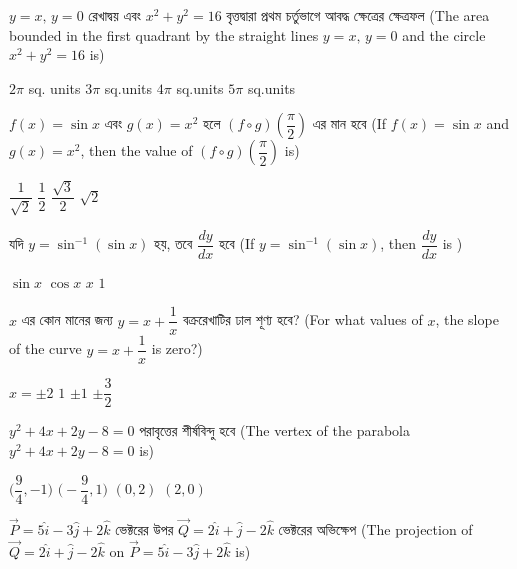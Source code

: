 \documentclass[addpoints]{exam}
\begin{document}
\begin{questions}
\question   $ y=x,\, y=0 $ রেখাদ্বয় এবং $ x^2 + y^2 =16 $ বৃত্তদ্বারা প্রথম চর্তুভাগে আবদ্ধ ক্ষেত্রের ক্ষেত্রফল (The area bounded in the first quadrant by the straight lines $ y=x,\, y=0 $ and the circle $ x^2 + y^2 =16 $ is)

\begin{oneparchoices}
\choice $ 2\pi$ sq. units
\choice $ 3\pi $ sq.units
\choice $ 4\pi $ sq.units
\choice $ 5\pi $ sq.units

\end{oneparchoices}

\question  $ f(x) = \sin x $ এবং $ g(x) = x^2 $ হলে $ (f\circ g)(\dfrac{\pi}{2}) $ এর মান হবে (If $ f(x) = \sin x $ and $ g(x) = x^2 $, then the value of $ (f\circ g)(\dfrac{\pi}{2}) $ is)

\begin{oneparchoices}
\choice $ \dfrac{1}{\sqrt{2}}$ 
\choice $ \dfrac{1}{2} $ 
\choice $ \dfrac{\sqrt{3}}{2} $ 
\choice $ \sqrt{2} $ 

\end{oneparchoices}

\question    যদি $ y=\sin^{-1}(\sin x) $ হয়,  তবে $ \dfrac{dy}{dx} $ হবে (If $ y=\sin^{-1}(\sin x) $, then $ \dfrac{dy}{dx} $ is )

\begin{oneparchoices}
\choice $ \sin x$ 
\choice $ \cos x $ 
\choice $ x $ 
\choice $ 1 $ 

\end{oneparchoices}

\question    $ x $ এর কোন মানের জন্য $ y= x+ \dfrac{1}{x} $ বক্ররেখাটির ঢাল শূণ্য হবে? (For what values of $ x $, the slope of the curve $ y= x+ \dfrac{1}{x} $ is zero?)

\begin{oneparchoices}
\choice $ x=\pm 2 $
\choice $ 1 $
\choice $ \pm 1 $
\choice  $ \pm \dfrac{3}{2} $

\end{oneparchoices}

\question $ y^2 +4x+2y-8=0 $  পরাবৃত্তের শীর্ষবিন্দু হবে (The vertex of the parabola $ y^2 +4x+2y-8=0 $ is)

\begin{oneparchoices}
\choice $ \Big( \dfrac{9}{4}, -1\Big) $
\choice $ \Big(- \dfrac{9}{4}, 1\Big) $
\choice $ (0,2) $
\choice  $ (2,0) $

\end{oneparchoices}


\question  $ \vec{P} = 5\hat{i}-3\hat{j}+2\hat{k} $  ভেক্টরের উপর $ \vec{Q} = 2\hat{i}+\hat{j}-2\hat{k} $ ভেক্টরের অভিক্ষেপ (The projection of $ \vec{Q} = 2\hat{i}+\hat{j}-2\hat{k} $ on $ \vec{P} = 5\hat{i}-3\hat{j}+2\hat{k} $ is)


\end{questions}
\end{document}
